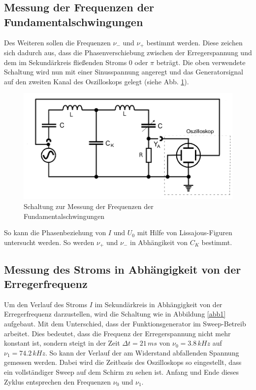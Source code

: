 \documentclass[11pt,ngerman,a4paper]{article}
\begin{document}
\subsection{Messung der Frequenzen der Fundamentalschwingungen}
Des Weiteren sollen die Frequenzen $\nu_-$ und $\nu_+$ bestimmt werden. Diese zeichen sich dadurch aus, dass die Phasenverschiebung zwischen der Erregerspannung und dem im Sekundärkreis fließenden Stroms $0$ oder $\pi$ beträgt. Die oben verwendete Schaltung wird nun mit einer Sinusspannung angeregt und das Generatorsignal auf den zweiten Kanal des Oszilloskops gelegt (siehe Abb. \ref{abb3}).
\begin{figure}[h!]
\centering
\includegraphics[scale=0.5]{Abb/abb3.png}
\caption{Schaltung zur Messung der Frequenzen der Fundamentalschwingungen}
\label{abb3}
\end{figure}
So kann die Phasenbeziehung von $I$ und $U_0$ mit Hilfe von Lissajous-Figuren untersucht werden. So werden $\nu_+$ und $\nu_-$ in Abhängikeit von $C_K$ bestimmt.
\subsection{Messung des Stroms in Abhängigkeit von der Erregerfrequenz}
Um den Verlauf des Stroms $I$ im Sekundärkreis in Abhängigkeit von der Erregerfrequenz darzustellen, wird die Schaltung wie in Abbildung \ref{abb1} aufgebaut. Mit dem Unterschied, dass der Funktionsgenerator im Sweep-Betreib arbeitet. Dies bedeutet, dass die Frequenz der Erregerspannung nicht mehr konstant ist, sondern steigt in der Zeit $\Delta t = 21\,ms$ von $\nu_0 = 3.8\,kHz$ auf $\nu_1 = 74.2\,kHz$. So kann der Verlauf der am Widerstand abfallenden Spannung gemessen werden. Dabei wird die Zeitbasis des Oszilloskops so eingestellt, dass ein vollständiger Sweep auf dem Schirm zu sehen ist. Anfang und Ende dieses Zyklus entsprechen den Frequenzen $\nu_0$ und $\nu_1$.     
\end{document}
